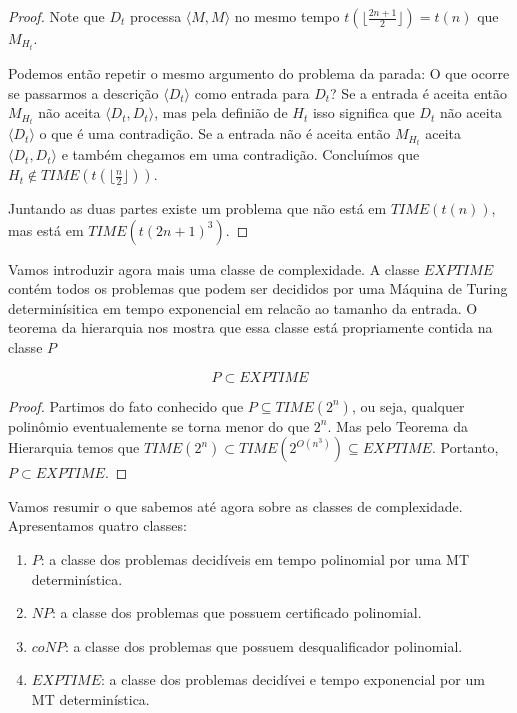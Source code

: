 \begin{proof}
  Note que $D_t$ processa $\langle M, M \rangle$ no mesmo tempo $t(\lfloor \frac{2n+1}{2}\rfloor) = t(n)$ que $M_{H_t}$.

  Podemos então repetir o mesmo argumento do problema da parada:
  O que ocorre se passarmos a descrição $\langle D_t \rangle$ como entrada para $D_t$?
  Se a entrada é aceita então $M_{H_t}$ não aceita $\langle D_t, D_t \rangle$, mas pela definião de $H_t$ isso significa que $D_t$ não aceita $\langle D_t \rangle$ o que é uma contradição.
  Se a entrada não é aceita então $M_{H_t}$ aceita $\langle D_t, D_t \rangle$ e também chegamos em uma contradição.
  Concluímos que $H_t \notin TIME(t(\lfloor \frac{n}{2}\rfloor))$.

  Juntando as duas partes existe um problema que não está em $TIME(t(n))$, mas está em $TIME(t(2n + 1)^3)$.
\end{proof}

Vamos introduzir agora mais uma classe de complexidade.
A classe $EXPTIME$ contém todos os problemas que podem ser decididos por uma Máquina de Turing determinísitica em tempo exponencial em relacão ao tamanho da entrada.
O teorema da hierarquia nos mostra que essa classe está propriamente contida na classe $P$

\begin{corollary}
  \begin{displaymath}
    P \subset EXPTIME
  \end{displaymath}
\end{corollary}
\begin{proof}
  Partimos do fato conhecido que $P \subseteq TIME(2^n)$, ou seja, qualquer polinômio eventualemente se torna menor do que $2^n$.
  Mas pelo Teorema da Hierarquia temos que $TIME(2^n) \subset TIME(2^{O(n^3)}) \subseteq EXPTIME$.
  Portanto, $P \subset EXPTIME$.
\end{proof}

Vamos resumir o que sabemos até agora sobre as classes de complexidade.
Apresentamos quatro classes:
\begin{enumerate}
\item $P$: a classe dos problemas decidíveis em tempo polinomial por uma MT determinística.
\item $NP$: a classe dos problemas que possuem certificado polinomial.
\item $coNP$: a classe dos problemas que possuem desqualificador polinomial.
\item $EXPTIME$: a classe dos problemas decidívei e tempo exponencial por um MT determinística.
\end{enumerate}

